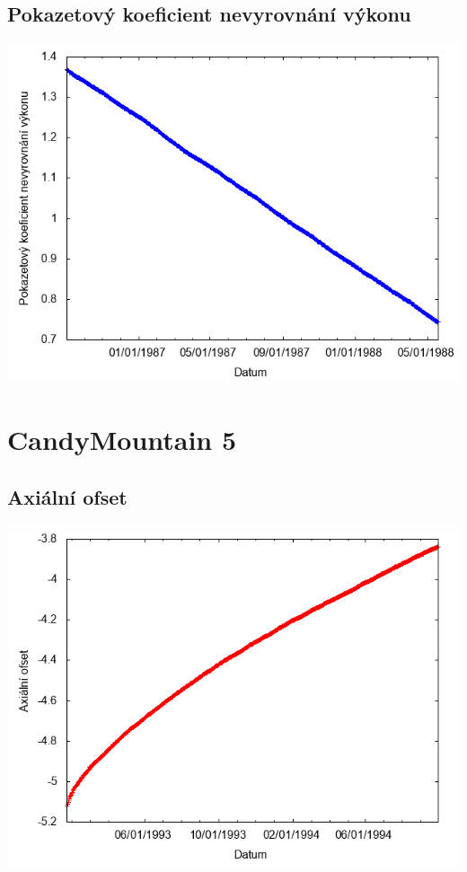\documentclass[a4paper,twoside,11pt]{article}
\begin{document}
\subsection*{Pokazetový koeficient nevyrovnání výkonu}
\begin{center}
\includegraphics[width=.8\textwidth]{graphs/CandyMountain_04_fha.png}
\end{center}

\newpage
\section*{CandyMountain 5}
\subsection*{Axiální ofset}
\begin{center}
\includegraphics[width=.8\textwidth]{graphs/CandyMountain_05_ao.png}
\end{center}
\end{document}
